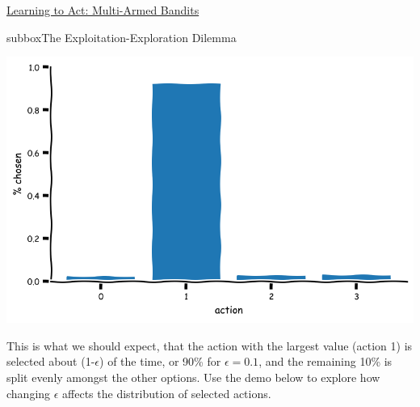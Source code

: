\begin{textbox}{\href{https://compneuro.neuromatch.io/tutorials/W3D4_ReinforcementLearning/student/W3D4_Tutorial2.html}{Learning to Act: Multi-Armed Bandits } }
\begin{subbox}{subbox}{The Exploitation-Exploration Dilemma}
\begin{center}
\includegraphics[scale=0.18]{Figures/RL/RL_Figure8.png}
\end{center}
This is what we should expect, that the action with the largest value (action 1) is selected about (1-$\epsilon$) of the time, or 90\% for $\epsilon = 0.1$, and the remaining 10\% is split evenly amongst the other options. Use the demo below to explore how changing $\epsilon$ affects the distribution of selected actions.

\end{subbox}
\end{textbox}
